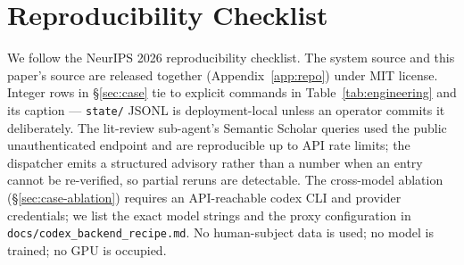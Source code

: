 \section{Reproducibility Checklist}
\label{app:reproducibility}

We follow the NeurIPS 2026 reproducibility checklist. The system source
and this paper's source are released together (Appendix~\ref{app:repo})
under MIT license. Integer rows in \S\ref{sec:case} tie to explicit
commands in Table~\ref{tab:engineering} and its caption ---
\texttt{state/} JSONL is deployment-local unless an operator commits it
deliberately. The lit-review
sub-agent's Semantic Scholar queries used the public unauthenticated
endpoint and are reproducible up to API rate limits; the dispatcher
emits a structured advisory rather than a number when an entry cannot
be re-verified, so partial reruns are detectable. The cross-model
ablation (\S\ref{sec:case-ablation}) requires an API-reachable codex CLI
and provider credentials; we list the exact model strings and the proxy
configuration in \texttt{docs/codex\_backend\_recipe.md}. No
human-subject data is used; no model is trained; no GPU is occupied.
